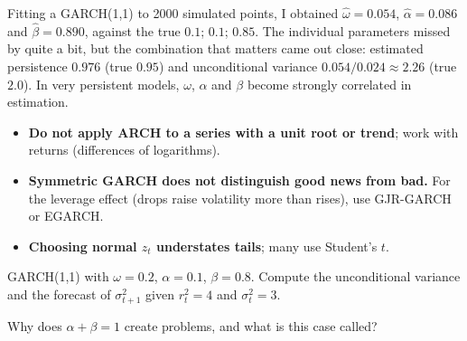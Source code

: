 \begin{simulacao}
Fitting a GARCH(1,1) to 2000 simulated points, I obtained $\hat\omega=0.054$, $\hat\alpha=0.086$ and $\hat\beta=0.890$, against the true $0.1$; $0.1$; $0.85$. The individual parameters missed by quite a bit, but the combination that matters came out close: estimated persistence $0.976$ (true $0.95$) and unconditional variance $0.054/0.024\approx2.26$ (true $2.0$). In very persistent models, $\omega$, $\alpha$ and $\beta$ become strongly correlated in estimation.
\end{simulacao}

\begin{atencao}
\begin{itemize}[leftmargin=1.2em]
\item \textbf{Do not apply ARCH to a series with a unit root or trend}; work with returns (differences of logarithms).
\item \textbf{Symmetric GARCH does not distinguish good news from bad.} For the leverage effect (drops raise volatility more than rises), use GJR-GARCH or EGARCH.
\item \textbf{Choosing normal $z_t$ understates tails}; many use Student's $t$.
\end{itemize}
\end{atencao}

\begin{exercicio}
GARCH(1,1) with $\omega=0.2$, $\alpha=0.1$, $\beta=0.8$. Compute the unconditional variance and the forecast of $\sigma^2_{t+1}$ given $r_t^2=4$ and $\sigma_t^2=3$.
\end{exercicio}

\begin{exercicio}
Why does $\alpha+\beta=1$ create problems, and what is this case called?
\end{exercicio}

